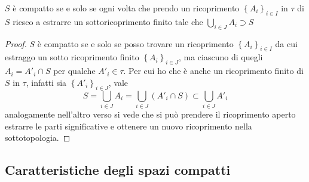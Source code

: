\begin{remark}
	$S$ è compatto se e solo se ogni volta che prendo un ricoprimento $\left\{A_i\right\}_{i \in I}$ in $\tau$ di $S$ riesco a estrarre un sottoricoprimento finito tale che $\bigcup_{i \in J} A_i \supset S$ 
	\begin{proof}
		$S$ è compatto se e solo se posso trovare un ricoprimento $\left\{A_i\right\}_{i \in I}$ da cui estraggo un sotto ricoprimento finito $\left\{A_i\right\}_{i \in J}$, ma ciascuno di quegli $A_i = A'_i \cap S$ per qualche $A'_i \in \tau$. Per cui ho che è anche un ricoprimento finito di $S$ in $\tau$, infatti sia $\left\{A'_i\right\}_{i\in J}$, vale 
		\begin{equation*}
			S = \bigcup_{i \in J} A_i = \bigcup_{i \in J} (A'_i \cap S)  \subset  \bigcup_{i \in J} A'_i
		\end{equation*}
		analogamente nell'altro verso si vede che si può prendere il ricoprimento aperto estrarre le parti significative e ottenere un nuovo ricoprimento nella sottotopologia.
	\end{proof}
\end{remark}



\subsection{\textcolor{TopGener}{\textbf{Caratteristiche degli spazi compatti}}}




